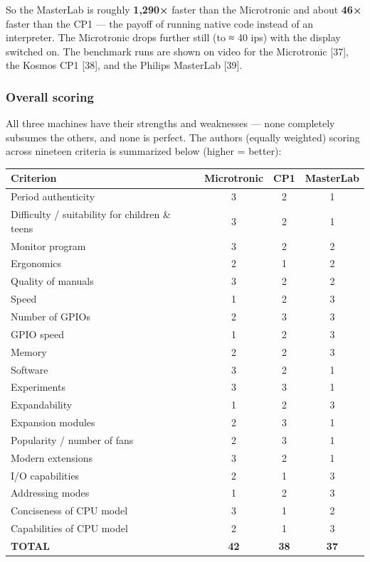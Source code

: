 \documentclass[
  11pt,
  letterpaper,
]{article}
\newcounter{none} %
\begin{document}
So the MasterLab is roughly \textbf{1,290×} faster than the Microtronic
and about \textbf{46×} faster than the CP1 --- the payoff of running
native code instead of an interpreter. The Microtronic drops further
still (to ≈ 40 ips) with the display switched on. The benchmark runs are
shown on video for the Microtronic {[}37{]}, the Kosmos CP1 {[}38{]},
and the Philips MasterLab {[}39{]}.

\subsubsection{Overall scoring}\label{overall-scoring}

All three machines have their strengths and weaknesses --- none
completely subsumes the others, and none is perfect. The
author\textquotesingle s (equally weighted) scoring across nineteen
criteria is summarized below (higher = better):

{\def\LTcaptype{none} %
\begin{longtable}[]{@{}lccc@{}}
\toprule\noalign{}
Criterion & Microtronic & CP1 & MasterLab \\
\midrule\noalign{}
\endhead
\bottomrule\noalign{}
\endlastfoot
Period authenticity & 3 & 2 & 1 \\
Difficulty / suitability for children \& teens & 3 & 2 & 1 \\
Monitor program & 3 & 2 & 2 \\
Ergonomics & 2 & 1 & 2 \\
Quality of manuals & 3 & 2 & 2 \\
Speed & 1 & 2 & 3 \\
Number of GPIOs & 2 & 3 & 3 \\
GPIO speed & 1 & 2 & 3 \\
Memory & 2 & 2 & 3 \\
Software & 3 & 2 & 1 \\
Experiments & 3 & 3 & 1 \\
Expandability & 1 & 2 & 3 \\
Expansion modules & 2 & 3 & 1 \\
Popularity / number of fans & 2 & 3 & 1 \\
Modern extensions & 3 & 2 & 1 \\
I/O capabilities & 2 & 1 & 3 \\
Addressing modes & 1 & 2 & 3 \\
Conciseness of CPU model & 3 & 1 & 2 \\
Capabilities of CPU model & 2 & 1 & 3 \\
\textbf{TOTAL} & \textbf{42} & \textbf{38} & \textbf{37} \\
\end{longtable}
}
\end{document}
